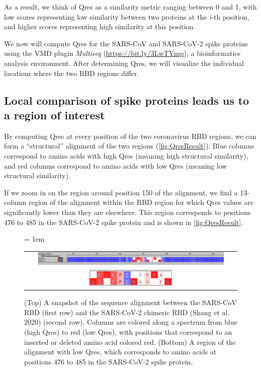 As a result, we think of Qres as a similarity metric ranging between 0 and 1, with low scores representing low similarity between two proteins at the \textit{i}-th position, and higher scores representing high similarity at this position.

We now will compute Qres for the SARS-CoV and SARS-CoV-2 spike proteins using the VMD plugin \textit{Multiseq} (\url{https://bit.ly/3LwTYmp}), a bioinformatics analysis environment. After determining Qres, we will visualize the individual locations where the two RBD regions differ. 

\FloatBarrier
{}
\subsection{Local comparison of spike proteins leads us to a region of interest}

By computing Qres at every position of the two coronavirus RBD regions, we can form a ``structural'' alignment of the two regions (\autoref{fig:QresResult}). Blue columns correspond to amino acids with high Qres (meaning high structural similarity), and red columns correspond to amino acids with low Qres (meaning low structural similarity).

If we zoom in on the region around position 150 of the alignment, we find a 13-column region of the alignment within the RBD region for which Qres values are significantly lower than they are elsewhere. This region corresponds to positions 476 to 485 in the SARS-CoV-2 spike protein and is shown in \autoref{fig:QresResult}.

\begin{figure}[h]
	\centering
	\tabcolsep = 1em
	\mySfFamily
	\begin{tabular}{c}
		\includegraphics[width = 0.9\textwidth]{../images/QresResult.png} \\
		\includegraphics[width = 0.4\textwidth]{../images/QresResult_cropped.png} \\
	\end{tabular}
	\caption{(Top) A snapshot of the sequence alignment between the SARS-CoV RBD (first row) and the SARS-CoV-2 chimeric RBD (Shang et al. 2020) (second row). Columns are colored along a spectrum from blue (high Qres) to red (low Qres), with positions that correspond to an inserted or deleted amino acid colored red. (Bottom) A region of the alignment with low Qres, which corresponds to amino acids at positions 476 to 485 in the SARS-CoV-2 spike protein.}
	\label{fig:QresResult}
\end{figure}

